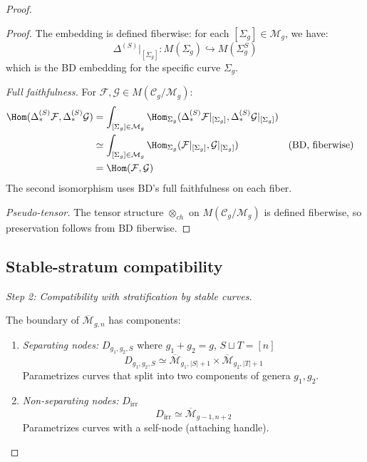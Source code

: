 \begin{proof}
\begin{proof}
The embedding is defined fiberwise: for each $[\Sigma_g] \in \mathcal{M}_g$, we have:
\[\Delta^{(S)}|_{[\Sigma_g]}: M(\Sigma_g) \hookrightarrow M(\Sigma_g^S)\]
which is the BD embedding for the specific curve $\Sigma_g$.

\emph{Full faithfulness.} For $\mathcal{F}, \mathcal{G} \in M(\mathcal{C}_g/\mathcal{M}_g)$:
\begin{align*}
\Hom(\Delta^{(S)}_* \mathcal{F}, \Delta^{(S)}_* \mathcal{G})
&= \int_{[\Sigma_g] \in \mathcal{M}_g} \Hom_{\Sigma_g}(\Delta^{(S)}_* \mathcal{F}|_{[\Sigma_g]}, \Delta^{(S)}_* \mathcal{G}|_{[\Sigma_g]}) \\
&\simeq \int_{[\Sigma_g] \in \mathcal{M}_g} \Hom_{\Sigma_g}(\mathcal{F}|_{[\Sigma_g]}, \mathcal{G}|_{[\Sigma_g]}) && \text{(BD, fiberwise)} \\
&= \Hom(\mathcal{F}, \mathcal{G})
\end{align*}
The second isomorphism uses BD's full faithfulness on each fiber.

\emph{Pseudo-tensor.} The tensor structure $\otimes_{ch}$ on $M(\mathcal{C}_g/\mathcal{M}_g)$ is defined fiberwise, so preservation follows from BD fiberwise. \qedhere
\end{proof}

\subsection*{Stable-stratum compatibility}

\emph{Step 2: Compatibility with stratification by stable curves.}

\begin{definition}\label{def:boundary-strata}
The boundary of $\overline{\mathcal{M}}_{g,n}$ has components:
\begin{enumerate}
\item \emph{Separating nodes:} $D_{g_1,g_2,S}$ where $g_1 + g_2 = g$, $S \sqcup T = [n]$
\[D_{g_1,g_2,S} \simeq \overline{\mathcal{M}}_{g_1, |S|+1} \times \overline{\mathcal{M}}_{g_2, |T|+1}\]
Parametrizes curves that split into two components of genera $g_1, g_2$.

\item \emph{Non-separating nodes:} $D_{\text{irr}}$
\[D_{\text{irr}} \simeq \overline{\mathcal{M}}_{g-1, n+2}\]
Parametrizes curves with a self-node (attaching handle).
\end{enumerate}
\end{definition}


\end{proof}
